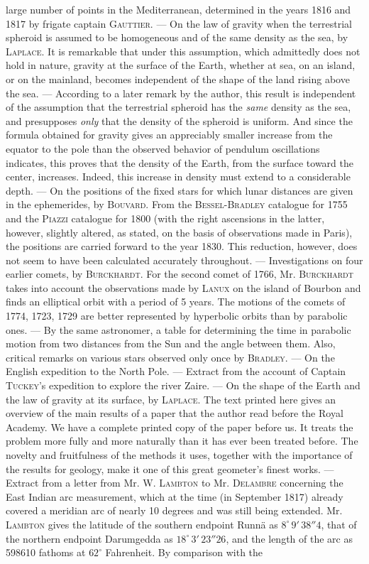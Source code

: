 large number of points in the Mediterranean, determined in the years 1816 and 1817 by frigate captain \textsc{Gauttier}. --- On the law of gravity when the terrestrial spheroid is assumed to be homogeneous and of the same density as the sea, by \textsc{Laplace}. It is remarkable that under this assumption, which admittedly does not hold in nature, gravity at the surface of the Earth, whether at sea, on an island, or on the mainland, becomes independent of the shape of the land rising above the sea. --- According to a later remark by the author, this result is independent of the assumption that the terrestrial spheroid has the \emph{same} density as the sea, and presupposes \emph{only} that the density of the spheroid is uniform. And since the formula obtained for gravity gives an appreciably smaller increase from the equator to the pole than the observed behavior of pendulum oscillations indicates, this proves that the density of the Earth, from the surface toward the center, increases. Indeed, this increase in density must extend to a considerable depth. --- On the positions of the fixed stars for which lunar distances are given in the ephemerides, by \textsc{Bouvard}. From the \textsc{Bessel}-\textsc{Bradley} catalogue for 1755 and the \textsc{Piazzi} catalogue for 1800 (with the right ascensions in the latter, however, slightly altered, as stated, on the basis of observations made in Paris), the positions are carried forward to the year 1830. This reduction, however, does not seem to have been calculated accurately throughout. --- Investigations on four earlier comets, by \textsc{Burckhardt}. For the second comet of 1766, Mr. \textsc{Burckhardt} takes into account the observations made by \textsc{Lanux} on the island of Bourbon and finds an elliptical orbit with a period of 5 years. The motions of the comets of 1774, 1723, 1729 are better represented by hyperbolic orbits than by parabolic ones. --- By the same astronomer, a table for determining the time in parabolic motion from two distances from the Sun and the angle between them. Also, critical remarks on various stars observed only once by \textsc{Bradley}. --- On the English expedition to the North Pole. --- Extract from the account of Captain \textsc{Tuckey}'s expedition to explore the river Zaire. --- On the shape of the Earth and the law of gravity at its surface, by \textsc{Laplace}. The text printed here gives an overview of the main results of a paper that the author read before the Royal Academy. We have a complete printed copy of the paper before us. It treats the problem more fully and more naturally than it has ever been treated before. The novelty and fruitfulness of the methods it uses, together with the importance of the results for geology, make it one of this great geometer's finest works. --- Extract from a letter from Mr. W. \textsc{Lambton} to Mr. \textsc{Delambre} concerning the East Indian arc measurement, which at the time (in September 1817) already covered a meridian arc of nearly 10 degrees and was still being extended. Mr. \textsc{Lambton} gives the latitude of the southern endpoint Runnä as $8^\circ\,9'\,38''4$, that of the northern endpoint Darumgedda as $18^\circ\,3'\,23''26$, and the length of the arc as 598610 fathoms at $62^\circ$ Fahrenheit. By comparison with the 